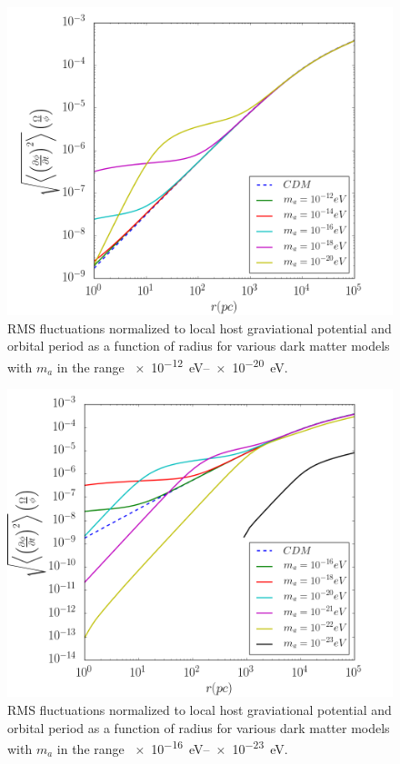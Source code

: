 \documentclass[usenatbib]{mnras}
\begin{document}
\begin{figure}
\includegraphics[width=\columnwidth]{High_Mass_Fluctuatations.png}
\vspace*{-5mm}
\caption{RMS fluctuations normalized to local host graviational potential and orbital period as a function of radius for various dark matter models with $m_a$ in the range \SIrange{e-12}{e-20}{\electronvolt}.}
\label{fig:highfluc}
\end{figure}

\begin{figure}
\includegraphics[width=\columnwidth]{Normed_Fluctuations.png}
\vspace*{-5mm}
\caption{RMS fluctuations normalized to local host graviational potential and orbital period as a function of radius for various dark matter models with $m_a$ in the range \SIrange{e-16}{e-23}{\electronvolt}.}
\label{fig:normfluc}
\end{figure}
\end{document}
